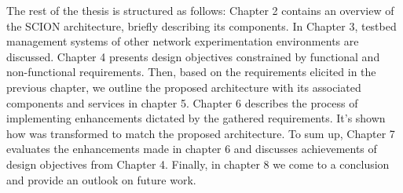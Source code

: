 The rest of the thesis is structured as follows: Chapter 2 contains an overview of the SCION architecture, briefly describing its components. In Chapter 3, testbed management systems of other network experimentation environments are discussed. Chapter 4 presents design objectives constrained by functional and non-functional requirements. Then, based on the requirements elicited in the previous chapter, we outline the proposed \lcs architecture with its associated components and services in chapter 5. Chapter 6 describes the process of implementing enhancements dictated by the gathered requirements. It's shown how \lcs was transformed to match the proposed architecture. To sum up, Chapter 7 evaluates the enhancements made in chapter 6 and discusses achievements of design objectives from Chapter 4. Finally, in chapter 8 we come to a conclusion and provide an outlook on future work.
 